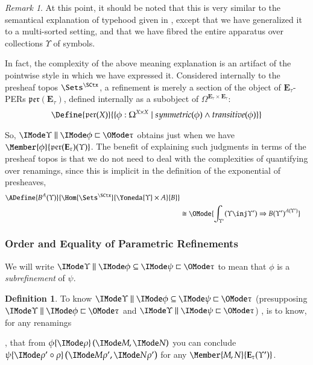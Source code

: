 \documentclass[11pt]{article}
\theoremstyle{definition}
\newtheorem{definition}[thm]{Definition}
\theoremstyle{remark}
\newtheorem{remark}[thm]{Remark}
\numberwithin{equation}{section}
\newcommand\Exprs{\mathbf{E}}
\begin{document}
\begin{remark}

  At this point, it should be noted that this is very similar to the semantical
  explanation of typehood given in \cite{martin-lof:1979}, except that we have
  generalized it to a multi-sorted setting, and that we have fibred the entire
  apparatus over collections $\Upsilon$ of symbols.

  In fact, the complexity of the above meaning explanation is an artifact of
  the pointwise style in which we have expressed it. Considered internally to
  the presheaf topos $\Sets^\SCtx$, a refinement is merely a section of the
  object of $\Exprs_\tau$-PERs $\mathfrak{per}(\Exprs_\tau)$, defined
  internally as a subobject of $\Omega^{\Exprs_\tau\times\Exprs_\tau}$:
  \[
    \Define{
      \mathfrak{per}(X)
    }{
      \{ \phi : \Omega^{X\times X}
         \mid
         symmetric(\phi)
         \land transitive(\phi)
      \}
    }
  \]

  So, $\Refines{\Upsilon}{\phi}{\tau}$ obtains just when we have
  $\Member{\phi}{\mathfrak{per}(\Exprs_\tau)(\Upsilon)}$. The benefit of
  explaining such judgments in terms of the presheaf topos is that we do not
  need to deal with the complexities of quantifying over renamings, since this
  is implicit in the definition of the exponential of presheaves,
  \begin{align*}
    \ADefine{
      B^A(\Upsilon)
    }{
      \Hom{\Sets^\SCtx}{
        \Yoneda{\Upsilon}\times A
      }{
        B
      }
    }\\
    &\cong
    \OMode{
      \int_{\Upsilon'}
      (\Upsilon\inj\Upsilon')
      \Rightarrow
      {B(\Upsilon')}^{A(\Upsilon')}
    }
  \end{align*}

\end{remark}

\subsubsection{Order and Equality of Parametric Refinements}

We will write $\IsSubrefinement{\Upsilon}{\phi}{\psi}{\tau}$ to mean that $\phi$ is
a \emph{subrefinement} of $\psi$.

\begin{definition}

  To know $\IsSubrefinement{\Upsilon}{\phi}{\psi}{\tau}$ (presupposing
  $\Refines{\Upsilon}{\phi}{\tau}$ and $\Refines{\Upsilon}{\psi}{\tau}$) , is
  to know, for any renamings
  ,
  that from $\RefEquate{\phi}{\rho}{M}{N}$ you can conclude
  $\RefEquate{\psi}{\rho'\circ\rho}{M\rho'}{N\rho'}$ for any
  $\Member{M,N}{\Exprs_\tau(\Upsilon')}$.

\end{definition}
\end{document}

